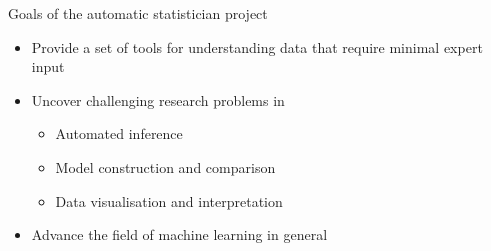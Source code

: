 \begin{frame}{Goals of the automatic statistician project}
  \begin{itemize}
    \item Provide a set of tools for understanding data that require minimal expert input
    \vspace{\baselineskip}
    \item Uncover challenging research problems in \eg
    \begin{itemize}
      \item Automated inference
      \item Model construction and comparison
      \item Data visualisation and interpretation
    \end{itemize}
    \vspace{\baselineskip}
    \item Advance the field of machine learning in general
    \vspace{\baselineskip}
  \end{itemize}
\end{frame}

